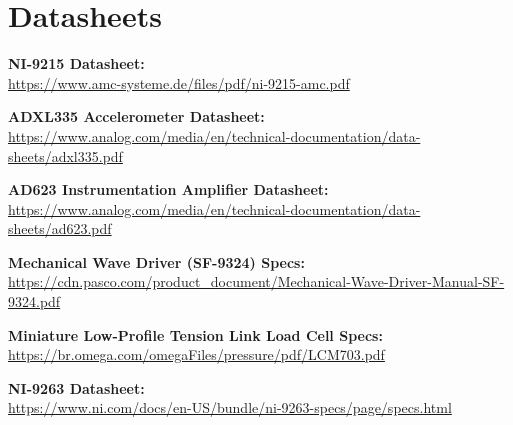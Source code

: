 \documentclass{article}
\begin{document}
\newpage
\begin{appendices}
\pagestyle{fancy}
\renewcommand{\thefigure}{A\arabic{figure}}
\setcounter{figure}{0}



\pagebreak

\hypertarget{datasheets}{}
\section{Datasheets}
\begin{enumerate}[label = {[\arabic*]}]
\item \textbf{NI-9215 Datasheet:}\\[2pt] \url{https://www.amc-systeme.de/files/pdf/ni-9215-amc.pdf}

\item \textbf{ADXL335 Accelerometer Datasheet:}\\[2pt] \url{https://www.analog.com/media/en/technical-documentation/data-sheets/adxl335.pdf}

\item \textbf{AD623 Instrumentation Amplifier Datasheet:}\\[2pt]
\url{https://www.analog.com/media/en/technical-documentation/data-sheets/ad623.pdf}

\item \textbf{Mechanical Wave Driver (SF-9324) Specs:}\\[2pt]
\url{https://cdn.pasco.com/product_document/Mechanical-Wave-Driver-Manual-SF-9324.pdf}

\item \textbf{Miniature Low-Profile Tension Link Load Cell Specs:}\\[2pt]
\url{https://br.omega.com/omegaFiles/pressure/pdf/LCM703.pdf}

\item \textbf{NI-9263 Datasheet:}\\[2pt] \url{https://www.ni.com/docs/en-US/bundle/ni-9263-specs/page/specs.html}

\end{enumerate}

\end{appendices}
\end{document}
